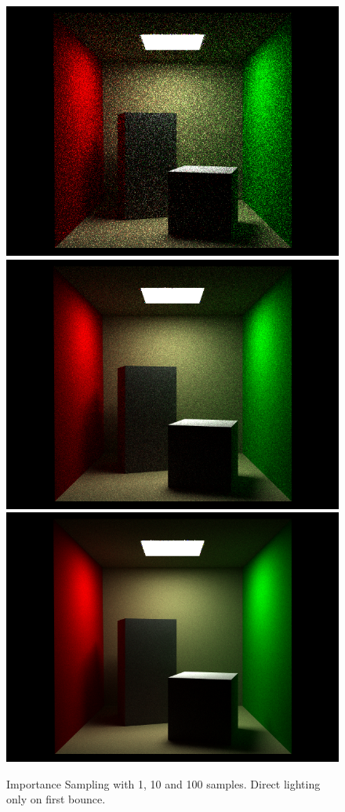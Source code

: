 \documentclass[11pt]{article}
\begin{document}
\begin{figure}
  \begin{center}
    \includegraphics[width=.4\linewidth]{figs/impsample1cornell_low}
    \includegraphics[width=.4\linewidth]{figs/impsample10cornell_low}
    \includegraphics[width=.4\linewidth]{figs/impsample100cornell_low}
  \end{center}
  \caption{Importance Sampling with 1, 10 and 100 samples. Direct lighting only on first bounce.}
\end{figure}
\end{document}
